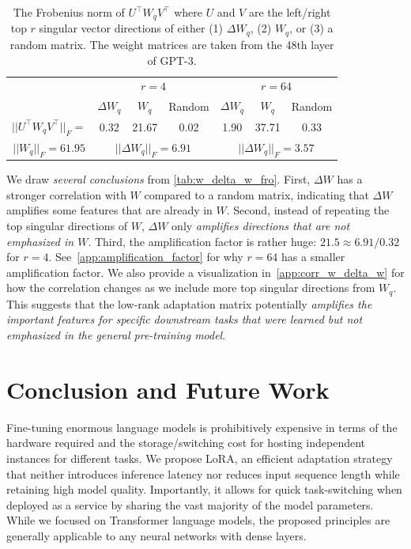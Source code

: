 \begin{table}[h]
  \centering
  \begin{tabular}{c|ccc|ccc}
  \hline
  \toprule
                             & \multicolumn{3}{c|}{$r=4$}             & \multicolumn{3}{c}{$r=64$}           \\
                                 & $\Delta W_q$ & $W_q$ & Random  &  $\Delta W_q$ & $W_q$  &  Random \\
  \midrule
  $||U^\top W_qV^\top||_F = $        & 0.32   & 21.67     & 0.02     & 1.90  & 37.71                & 0.33    \\
  \midrule
  $||W_q||_F = 61.95$                & \multicolumn{3}{c|}{$||\Delta W_q||_F = 6.91$}             
  & \multicolumn{3}{c}{$||\Delta W_q||_F = 3.57$}
  \\
  \bottomrule
  \end{tabular}
  \caption{The Frobenius norm of $U^\top W_qV^\top$ where $U$ and $V$ are the left/right top $r$ singular vector directions of either (1) $\Delta W_q$, (2) $W_q$, or (3) a random matrix. The weight matrices are taken from the 48th layer of GPT-3. 
  }
  \label{tab:w_delta_w_fro}
\end{table}

We draw \emph{several conclusions} from \autoref{tab:w_delta_w_fro}.
First, $\Delta W$ has a stronger correlation with $W$ compared to a random matrix, indicating that $\Delta W$ amplifies some features that are already in $W$.
Second, instead of repeating the top singular directions of $W$, $\Delta W$ only \emph{amplifies directions that are not emphasized in $W$}.
Third, the amplification factor is rather huge: $21.5\approx 6.91/0.32$ for $r=4$. 
See~\autoref{app:amplification_factor} for why $r=64$ has a smaller amplification factor.
We also provide a visualization in~\autoref{app:corr_w_delta_w} for how the correlation changes as we include more top singular directions from $W_q$.
This suggests that the low-rank adaptation matrix potentially \emph{amplifies the important features for specific downstream tasks that were learned but not emphasized in the general pre-training model}.

\section{Conclusion and Future Work}

Fine-tuning enormous language models is prohibitively expensive in terms of the hardware required and the storage/switching cost for hosting independent instances for different tasks.
We propose LoRA, an efficient adaptation strategy that neither introduces inference latency nor reduces input sequence length while retaining high model quality.
Importantly, it allows for quick task-switching when deployed as a service by sharing the vast majority of the model parameters.
While we focused on Transformer language models, the proposed principles are generally applicable to any neural networks with dense layers.

